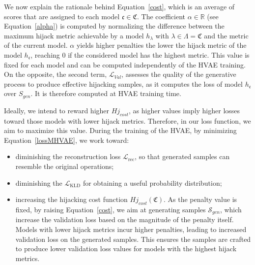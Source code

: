 We now explain the rationale behind Equation~\ref{cost}, which is an average of scores that are assigned to each model $\mathfrak{c} \in \mathfrak{C}$. 
The coefficient $\alpha \in \mathbb{R}$ (see Equation~\ref{alpha}) is computed by normalizing the difference between the maximum hijack metric achievable by a model $h_{\lambda}$ with $\lambda \in \Lambda = \mathfrak{C}$ and the metric of the current model.
$\alpha$ yields higher penalties the lower the hijack metric of the model $h_\mathfrak{c}$, reaching 0 if the considered model has the highest metric. This value is fixed for each model and can be computed independently of the HVAE training.
On the opposite, the second term, $\mathcal{L}_{Val}$, assesses the quality of the generative process to produce effective hijacking samples, as it computes the loss of model $h_\mathfrak{c}$ over $S_{gen}$. It is therefore computed at HVAE training time. 
\par
Ideally, we intend to reward higher $Hj_{cost}$, as higher values imply higher losses toward those models with lower hijack metrics.
Therefore, in our loss function, we aim to maximize this value.  
During the training of the HVAE, by minimizing Equation~\ref{lossMHVAE}, we work toward:
\begin{itemize}
    \item diminishing the reconstruction loss $\mathcal{L}_{\mathrm{rec}}$, so that generated samples can resemble the original operations;
    \item diminishing the $\mathcal{L}_{\mathrm{KLD}}$ for obtaining a useful probability distribution;
    \item increasing the hijacking cost function $Hj_{cost}(\mathfrak{C})$. As the penalty value is fixed, by raising Equation~\ref{cost}, we aim at generating samples $\mathcal{S}_{gen}$, which increase the validation loss based on the magnitude of the penalty itself.
    Models with lower hijack metrics incur higher penalties, leading to increased validation loss on the generated samples. This ensures the samples are crafted to produce lower validation loss values for models with the highest hijack metrics.
\end{itemize}
